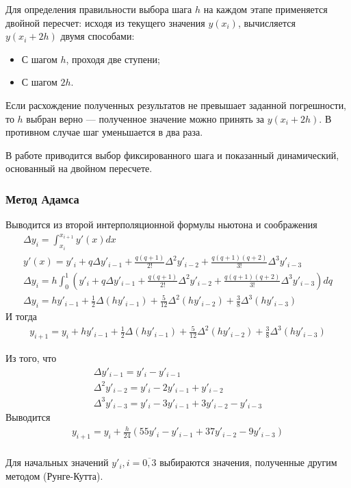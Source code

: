 Для определения правильности выбора шага \(h\) на каждом этапе применяется двойной пересчет: исходя из текущего значения \(y(x_i)\), вычисляется \(y(x_i + 2h)\) двумя способами:
\begin{itemize}
	\item С шагом \(h\), проходя две ступени;
	\item С шагом \(2h\).
\end{itemize}
Если расхождение полученных результатов не превышает заданной погрешности, то \(h\) выбран верно --- полученное значение можно принять за \(y(x_i + 2h)\). В противном случае шаг уменьшается в два раза.

В работе приводится выбор фиксированного шага и показанный динамический, основанный на двойном пересчете.

\subsubsection{Метод Адамса}
Выводится из второй интерполяционной формулы ньютона и соображения
\begin{align}
	\Delta y_i = \int_{x_i}^{x_{i+1}} y'(x) dx                                                                                                         \\
	y'(x) = y'_i + q \Delta y'_{i-1} + \frac{q(q + 1)}{2!} \Delta^2 y'_{i-2} + \frac{q(q+1)(q+2)}{3!}\Delta^3 y'_{i-3}                                 \\
	\Delta y_i = h \int_0^1\left( y'_i + q \Delta y'_{i-1} + \frac{q(q + 1)}{2!} \Delta^2 y'_{i-2} + \frac{q(q+1)(q+2)}{3!}\Delta^3 y'_{i-3}\right) dq \\
	\Delta y_i = hy'_{i-1} + \frac{1}{2}\Delta(h y'_{i-1}) + \frac{5}{12}\Delta^2(hy'_{i-2}) + \frac{3}{8}\Delta^3(hy'_{i-3})
\end{align}
И тогда
\begin{align}
	y_{i+1} = y_i + hy'_{i-1} + \frac{1}{2}\Delta(h y'_{i-1}) + \frac{5}{12}\Delta^2(hy'_{i-2}) + \frac{3}{8}\Delta^3(hy'_{i-3})
\end{align}

Из того, что
\begin{align*}
	\Delta y'_{i-1} = y'_i - y'_{i-1}               \\
	\Delta^2 y'_{i-2} = y'_i - 2y'_{i-1} + y'_{i-2} \\
	\Delta^3 y'_{i-3} = y'_i - 3y'_{i-1} + 3y'_{i-2} - y'_{i-3}
\end{align*}
Выводится
\begin{align}
	y_{i+1} = y_i + \frac{h}{24}(55 y'_i - y'_{i-1} + 37 y'_{i - 2} - 9 y'_{i-3}) \\
\end{align}

Для начальных значений \(y'_i, i = \overline{0, 3}\) выбираются значения, полученные другим методом (Рунге-Кутта).

